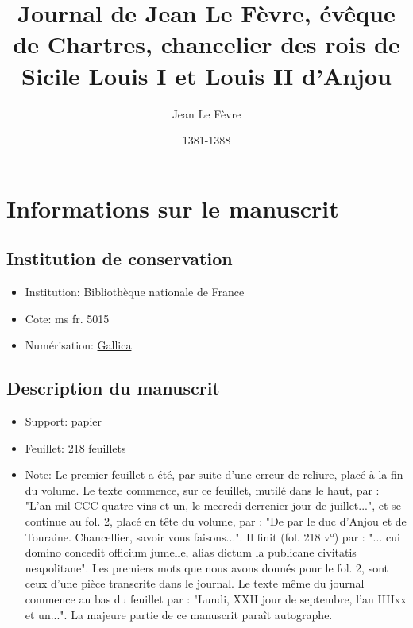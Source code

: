 \documentclass[]{book}
\title{Journal de Jean Le Fèvre, évêque de Chartres, chancelier des rois de Sicile Louis I et Louis II d'Anjou}
\author{Jean Le Fèvre}
\date{1381-1388}
\begin{document}
        \maketitle
        
        
        \chapter*{Informations sur le manuscrit}
        
        \section*{Institution de conservation}
        
        \begin{itemize}
            \item Institution: Bibliothèque nationale de France
            \item Cote: ms fr. 5015
            \item Numérisation: \href{https://gallica.bnf.fr/ark:/12148/btv1b9007462z}{Gallica}
        \end{itemize}
        
        \section*{Description du manuscrit}
        
        \begin{itemize}
            \item Support: papier
            \item Feuillet: 218 feuillets
            \item Note: Le premier feuillet a été, par suite d'une erreur de reliure, placé à la fin du volume. Le texte commence, sur ce feuillet, mutilé dans le haut, par : "L'an mil CCC quatre vins et un, le mecredi derrenier jour de juillet...", et se continue au fol. 2, placé en tête du volume, par : "De par le duc d'Anjou et de Touraine. Chancellier, savoir vous faisons...". Il finit (fol. 218 v°) par : "... cui domino concedit officium jumelle, alias dictum la publicane civitatis neapolitane". Les premiers mots que nous avons donnés pour le fol. 2, sont ceux d'une pièce transcrite dans le journal. Le texte même du journal commence au bas du feuillet par : "Lundi, XXII jour de septembre, l'an IIIIxx et un...". La majeure partie de ce manuscrit paraît autographe.
        \end{itemize}
        
\end{document}
